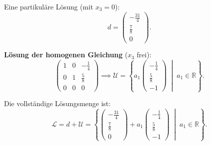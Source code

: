 \documentclass[a4paper,12pt]{article}
\begin{document}
Eine partikuläre Lösung (mit $x_3 = 0$):
\[
d = \begin{pmatrix}-\tfrac{31}{4}\\\tfrac{7}{8}\\0\end{pmatrix}.
\]

\noindent\textbf{Lösung der homogenen Gleichung} ($x_3$ frei):
\[
\left(\begin{array}{ccc}
1 & 0 & -\tfrac{1}{4} \\
0 & 1 & \tfrac{5}{8} \\
0 & 0 & 0
\end{array}\right)
\implies
\mathcal{U} = \left\{
a_1 \begin{pmatrix}-\tfrac{1}{4}\\\tfrac{5}{8}\\-1\end{pmatrix}
\;\middle|\; a_1 \in \mathbb{R}
\right\}.
\]

Die vollständige Lösungsmenge ist:
\[
\mathcal{L} = d + \mathcal{U}
= \left\{
\begin{pmatrix}-\tfrac{31}{4}\\\tfrac{7}{8}\\0\end{pmatrix}
+ a_1 \begin{pmatrix}-\tfrac{1}{4}\\\tfrac{5}{8}\\-1\end{pmatrix}
\;\middle|\; a_1 \in \mathbb{R}
\right\}.
\]
\end{document}
